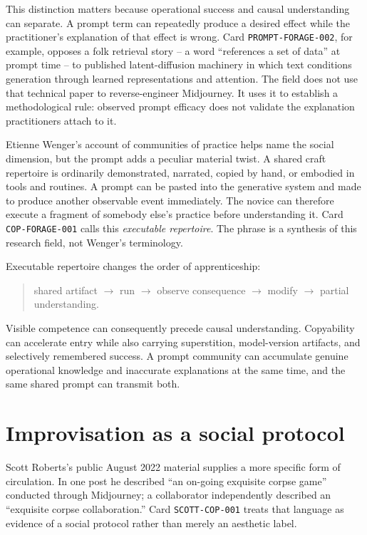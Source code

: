 \documentclass[11pt]{article}
\begin{document}
This distinction matters because operational success and causal understanding can separate. A prompt term can repeatedly produce a desired effect while the practitioner's explanation of that effect is wrong. Card \texttt{PROMPT-FORAGE-002}, for example, opposes a folk retrieval story -- a word ``references a set of data'' at prompt time -- to published latent-diffusion machinery in which text conditions generation through learned representations and attention. The field does not use that technical paper to reverse-engineer Midjourney. It uses it to establish a methodological rule: observed prompt efficacy does not validate the explanation practitioners attach to it.

Etienne Wenger's account of communities of practice helps name the social dimension, but the prompt adds a peculiar material twist. A shared craft repertoire is ordinarily demonstrated, narrated, copied by hand, or embodied in tools and routines. A prompt can be pasted into the generative system and made to produce another observable event immediately. The novice can therefore execute a fragment of somebody else's practice before understanding it. Card \texttt{COP-FORAGE-001} calls this \emph{executable repertoire}. The phrase is a synthesis of this research field, not Wenger's terminology.

Executable repertoire changes the order of apprenticeship:

\begin{quote}
shared artifact $\rightarrow$ run $\rightarrow$ observe consequence $\rightarrow$ modify $\rightarrow$ partial understanding.
\end{quote}

Visible competence can consequently precede causal understanding. Copyability can accelerate entry while also carrying superstition, model-version artifacts, and selectively remembered success. A prompt community can accumulate genuine operational knowledge and inaccurate explanations at the same time, and the same shared prompt can transmit both.

\section{Improvisation as a social protocol}

Scott Roberts's public August 2022 material supplies a more specific form of circulation. In one post he described ``an on-going exquisite corpse game'' conducted through Midjourney; a collaborator independently described an ``exquisite corpse collaboration.'' Card \texttt{SCOTT-COP-001} treats that language as evidence of a social protocol rather than merely an aesthetic label.
\end{document}
